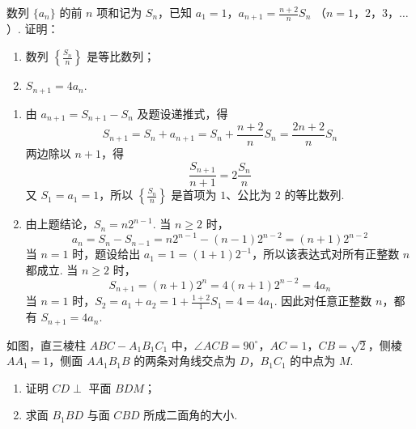 \begin{problem}
数列 \(\{a_{n}\}\) 的前 \(n\) 项和记为 \(S_{n}\)，已知 \(a_{1} = 1\)，\(a_{n+1} = \frac{n+2}{n} S_{n}\) （\(n = 1\)，\(2\)，\(3\)，\(\ldots\)）. 证明：

\begin{enumerate}
\item 数列 \( \left\{\frac{S_{n}}{n}\right\} \) 是等比数列；
\item \(S_{n + 1} = 4a_n\).
\end{enumerate}
\end{problem}

\begin{solution}
\begin{enumerate}
\item 由 \(a_{n+1}=S_{n+1}-S_n\) 及题设递推式，得
\[
S_{n+1}=S_n+a_{n+1}=S_n+\frac{n+2}{n}S_n=\frac{2n+2}{n}S_n
\]
两边除以 \(n+1\)，得
\[
\frac{S_{n+1}}{n+1}=2\frac{S_n}{n}
\]
又 \(S_1=a_1=1\)，所以 \(\left\{\frac{S_n}{n}\right\}\) 是首项为 \(1\)、公比为 \(2\) 的等比数列.

\item 由上题结论，\(S_n=n2^{n-1}\). 当 \(n\geqslant2\) 时，
\[
a_n=S_n-S_{n-1}=n2^{n-1}-(n-1)2^{n-2}=(n+1)2^{n-2}
\]
当 \(n=1\) 时，题设给出 \(a_1=1=(1+1)2^{-1}\)，所以该表达式对所有正整数 \(n\) 都成立. 当 \(n\geqslant2\) 时，
\[
S_{n+1}=(n+1)2^n=4(n+1)2^{n-2}=4a_n
\]
当 \(n=1\) 时，\(S_2=a_1+a_2=1+\frac{1+2}{1}S_1=4=4a_1\). 因此对任意正整数 \(n\)，都有 \(S_{n+1}=4a_n\).
\end{enumerate}
\end{solution}

\begin{problem}
如图，直三棱柱 \(ABC-A_1B_1C_1\) 中，\(\angle ACB = 90^\circ\)，\(AC = 1\)，\(CB = \sqrt{2}\)，侧棱 \(AA_1 = 1\)，侧面 \(AA_1B_1B\) 的两条对角线交点为 \(D\)，\(B_1C_1\) 的中点为 \(M\).

\begin{enumerate}
\item 证明 \(CD \perp\) 平面 \(BDM\)；
\item 求面 \(B_1BD\) 与面 \(CBD\) 所成二面角的大小.
\end{enumerate}

\end{problem}

